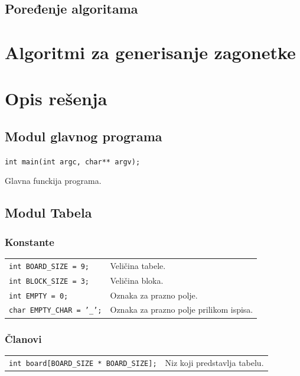 \documentclass[a4paper]{article}
\begin{document}
    \subsection{Poređenje algoritama}
    \newpage
    
    \section{Algoritmi za generisanje zagonetke}
    \newpage
    
    
    \section{Opis rešenja}
    
    \subsection{Modul glavnog programa}
    \texttt{int main(int argc, char** argv);}
    \par Glavna funckija programa.

    \subsection{Modul Tabela}
    
    \subsubsection{Konstante}
    \begin{tabular}{ l l }
        \par\texttt{int BOARD\_SIZE = 9;} & Veličina tabele. \\
        \par\texttt{int BLOCK\_SIZE = 3;} & Veličina bloka. \\
        \par\texttt{int EMPTY = 0;}  & Oznaka za prazno polje. \\
        \par\texttt{char EMPTY\_CHAR = '\_';}  & Oznaka za prazno polje prilikom ispisa.
    \end{tabular}
    
    \subsubsection{Članovi}
    \begin{tabular}{ l l }
        \par\texttt{int board[BOARD\_SIZE * BOARD\_SIZE];} & Niz koji predstavlja tabelu.\\
    \end{tabular}
    
\end{document}
